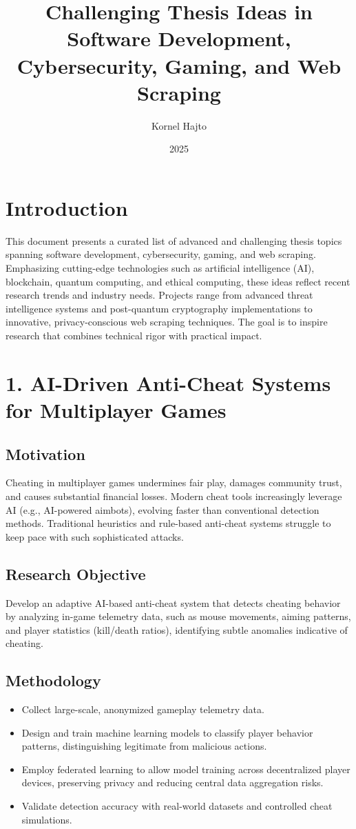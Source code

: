 \documentclass[11pt]{article}
\author{Kornel Hajto}
\date{2025}
\title{Challenging Thesis Ideas in Software Development, Cybersecurity, Gaming, and Web Scraping}
\begin{document}
\maketitle
\tableofcontents

\section{Introduction}
\label{sec:org72e8a1a}
This document presents a curated list of advanced and challenging thesis topics spanning software development, cybersecurity, gaming, and web scraping. Emphasizing cutting-edge technologies such as artificial intelligence (AI), blockchain, quantum computing, and ethical computing, these ideas reflect recent research trends and industry needs. Projects range from advanced threat intelligence systems and post-quantum cryptography implementations to innovative, privacy-conscious web scraping techniques. The goal is to inspire research that combines technical rigor with practical impact.
\section{1. AI-Driven Anti-Cheat Systems for Multiplayer Games}
\label{sec:org33576b8}
\subsection{Motivation}
\label{sec:orgcd8f9d9}
Cheating in multiplayer games undermines fair play, damages community trust, and causes substantial financial losses. Modern cheat tools increasingly leverage AI (e.g., AI-powered aimbots), evolving faster than conventional detection methods. Traditional heuristics and rule-based anti-cheat systems struggle to keep pace with such sophisticated attacks.
\subsection{Research Objective}
\label{sec:org0244f52}
Develop an adaptive AI-based anti-cheat system that detects cheating behavior by analyzing in-game telemetry data, such as mouse movements, aiming patterns, and player statistics (kill/death ratios), identifying subtle anomalies indicative of cheating.
\subsection{Methodology}
\label{sec:org5c664ae}
\begin{itemize}
\item Collect large-scale, anonymized gameplay telemetry data.
\item Design and train machine learning models to classify player behavior patterns, distinguishing legitimate from malicious actions.
\item Employ federated learning to allow model training across decentralized player devices, preserving privacy and reducing central data aggregation risks.
\item Validate detection accuracy with real-world datasets and controlled cheat simulations.
\end{itemize}
\end{document}
